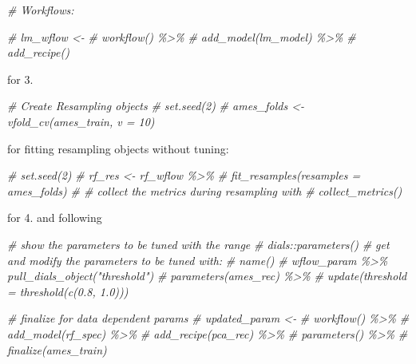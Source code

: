 \documentclass[
]{book}
\newenvironment{Shaded}{\begin{snugshade}}{\end{snugshade}}
\newcommand{\CommentTok}[1]{\textcolor[rgb]{0.56,0.35,0.01}{\textit{#1}}}
\begin{document}
\begin{Shaded}
\begin{Highlighting}[]
\CommentTok{\# Workflows:}

\CommentTok{\# lm\_wflow \textless{}{-} }
\CommentTok{\#   workflow() \%\textgreater{}\% }
\CommentTok{\#   add\_model(lm\_model) \%\textgreater{}\% }
\CommentTok{\#   add\_recipe()}
\end{Highlighting}
\end{Shaded}

for 3.

\begin{Shaded}
\begin{Highlighting}[]
\CommentTok{\# Create Resampling objects}
\CommentTok{\# set.seed(2)}
\CommentTok{\# ames\_folds \textless{}{-} vfold\_cv(ames\_train, v = 10)}
\end{Highlighting}
\end{Shaded}

for fitting resampling objects without tuning:

\begin{Shaded}
\begin{Highlighting}[]
\CommentTok{\# set.seed(2)}
\CommentTok{\# rf\_res \textless{}{-} rf\_wflow \%\textgreater{}\% }
\CommentTok{\#   fit\_resamples(resamples = ames\_folds)}
\CommentTok{\# \# collect the metrics during resampling with}
\CommentTok{\# collect\_metrics()}
\end{Highlighting}
\end{Shaded}

for 4. and following

\begin{Shaded}
\begin{Highlighting}[]
\CommentTok{\# show the parameters to be tuned with the range}
\CommentTok{\# dials::parameters()}
\CommentTok{\# get and modify the parameters to be tuned with:}
\CommentTok{\# name()}
\CommentTok{\# wflow\_param \%\textgreater{}\% pull\_dials\_object("threshold")}
\CommentTok{\# parameters(ames\_rec) \%\textgreater{}\% }
\CommentTok{\#  update(threshold = threshold(c(0.8, 1.0)))}

\CommentTok{\# finalize for data dependent params}
\CommentTok{\# updated\_param \textless{}{-} }
\CommentTok{\#   workflow() \%\textgreater{}\% }
\CommentTok{\#   add\_model(rf\_spec) \%\textgreater{}\% }
\CommentTok{\#   add\_recipe(pca\_rec) \%\textgreater{}\% }
\CommentTok{\#   parameters() \%\textgreater{}\% }
\CommentTok{\#   finalize(ames\_train)}
\end{Highlighting}
\end{Shaded}
\end{document}
